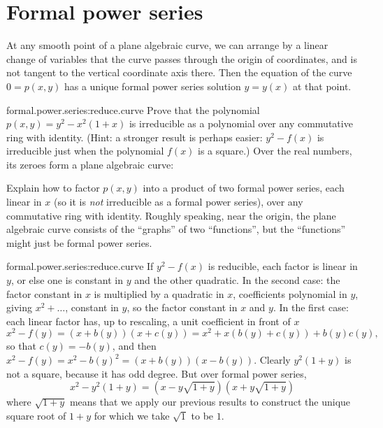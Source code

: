 \section{Formal power series}
\begin{corollary}
At any smooth point of a plane algebraic curve, we can arrange by a linear change of variables that the curve passes through the origin of coordinates, and is not tangent to the vertical coordinate axis there.
Then the equation of the curve \(0=p(x,y)\) has a unique formal power series solution \(y=y(x)\) at that point.
\end{corollary}
\begin{problem}{formal.power.series:reduce.curve}
Prove that the polynomial \(p(x,y)=y^2-x^2(1+x)\) is irreducible as a polynomial over any commutative ring with identity.
(Hint: a stronger result is perhaps easier: \(y^2-f(x)\) is irreducible just when the polynomial \(f(x)\) is a square.)
Over the real numbers, its zeroes form a plane algebraic curve:
\begin{center}
\pgfplotsset{compat=1.12,width=7cm}%

\end{center}
Explain how to factor \(p(x,y)\) into a product of two formal power series, each linear in \(x\) (so it is \emph{not} irreducible as a formal power series), over any commutative ring with identity.
Roughly speaking, near the origin, the plane algebraic curve consists of the ``graphs'' of two ``functions'', but the ``functions'' might just be formal power series.
\end{problem}
\begin{answer}{formal.power.series:reduce.curve}
If \(y^2-f(x)\) is reducible, each factor is linear in \(y\), or else one is constant in \(y\) and the other quadratic.
In the second case: the factor constant in \(x\) is multiplied by a quadratic in \(x\), coefficients polynomial in \(y\), giving \(x^2+\dots\), constant in \(y\), so the factor constant in \(x\) and \(y\).
In the first case: each linear factor has, up to rescaling, a unit coefficient in front of \(x\)
\[
x^2-f(y)=(x+b(y))(x+c(y))=x^2+x(b(y)+c(y))+b(y)c(y),
\]
so that \(c(y)=-b(y)\), and then \(x^2-f(y)=x^2-b(y)^2=(x+b(y))(x-b(y))\).
Clearly \(y^2(1+y)\) is not a square, because it has odd degree.
But over formal power series,
\[
x^2-y^2(1+y)=(x-y\sqrt{1+y})(x+y\sqrt{1+y})
\]
where \(\sqrt{1+y}\) means that we apply our previous results to construct the unique square root of \(1+y\) for which we take \(\sqrt{1}\) to be \(1\).
\end{answer}
